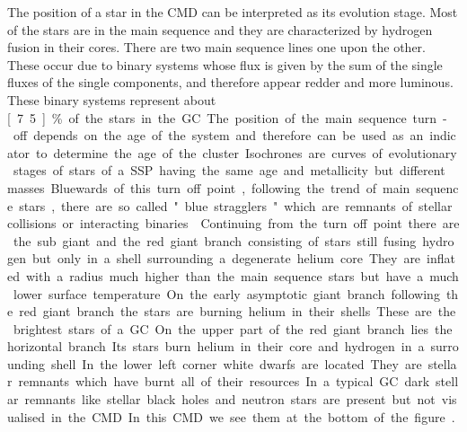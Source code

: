 The position of a star in the \ac{CMD} can be interpreted as its evolution stage. Most of the stars are in the main sequence and they are characterized by hydrogen fusion in their cores. There are two main sequence lines one upon the other. These occur due to binary systems whose flux is given by the sum of the single fluxes of the single components, and therefore appear redder and more luminous. These binary systems represent about \unit[7.5]{\%} of the stars in the \ac{GC}. The position of the main sequence turn-off depends on the age of the system and therefore can be used as an indicator to determine the age of the cluster. Isochrones are curves of evolutionary stages of stars of a \ac{SSP} having the same age and metallicity but different masses. Bluewards of this turn off point, following the trend of main sequence stars, there are so called "blue stragglers" which are remnants of stellar collisions or interacting binaries \citep[p.628]{2008gady.book.....B}. Continuing from the turn off point there are the sub giant and the red giant branch consisting of stars still fusing hydrogen but only in a shell surrounding a degenerate helium core. They are inflated with a radius much higher than the main sequence stars but have a much lower surface temperature. On the early asymptotic giant branch following the red giant branch the stars are burning helium in their shells. These are the brightest stars of a \ac{GC}. On the upper part of the red giant branch lies the horizontal branch. Its stars burn helium in their core and hydrogen in a surrounding shell. In the lower left corner white dwarfs are located. They are stellar remnants which have burnt all of their resources. In a typical \ac{GC} dark stellar remnants like stellar black holes and neutron stars are present but not visualised in the \ac{CMD}. In this \ac{CMD} we see them at the bottom of the figure. \cite[p.476-477]{2006ima..book.....C}.
